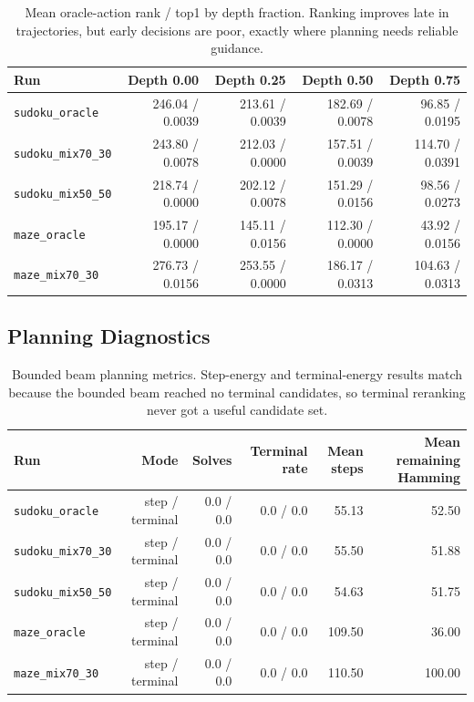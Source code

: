 \documentclass[11pt]{article}
\begin{document}
\begin{table}[H]
\centering
\scriptsize
\begin{tabular}{lrrrr}
\toprule
Run & Depth 0.00 & Depth 0.25 & Depth 0.50 & Depth 0.75 \\
\midrule
\texttt{sudoku\_oracle} & 246.04 / 0.0039 & 213.61 / 0.0039 & 182.69 / 0.0078 & 96.85 / 0.0195 \\
\texttt{sudoku\_mix70\_30} & 243.80 / 0.0078 & 212.03 / 0.0000 & 157.51 / 0.0039 & 114.70 / 0.0391 \\
\texttt{sudoku\_mix50\_50} & 218.74 / 0.0000 & 202.12 / 0.0078 & 151.29 / 0.0156 & 98.56 / 0.0273 \\
\texttt{maze\_oracle} & 195.17 / 0.0000 & 145.11 / 0.0156 & 112.30 / 0.0000 & 43.92 / 0.0156 \\
\texttt{maze\_mix70\_30} & 276.73 / 0.0156 & 253.55 / 0.0000 & 186.17 / 0.0313 & 104.63 / 0.0313 \\
\bottomrule
\end{tabular}
\caption{Mean oracle-action rank / top1 by depth fraction. Ranking improves late in trajectories, but early decisions are poor, exactly where planning needs reliable guidance.}
\end{table}

\subsection{Planning Diagnostics}

\begin{table}[H]
\centering
\small
\begin{tabular}{lrrrrr}
\toprule
Run & Mode & Solves & Terminal rate & Mean steps & Mean remaining Hamming \\
\midrule
\texttt{sudoku\_oracle} & step / terminal & 0.0 / 0.0 & 0.0 / 0.0 & 55.13 & 52.50 \\
\texttt{sudoku\_mix70\_30} & step / terminal & 0.0 / 0.0 & 0.0 / 0.0 & 55.50 & 51.88 \\
\texttt{sudoku\_mix50\_50} & step / terminal & 0.0 / 0.0 & 0.0 / 0.0 & 54.63 & 51.75 \\
\texttt{maze\_oracle} & step / terminal & 0.0 / 0.0 & 0.0 / 0.0 & 109.50 & 36.00 \\
\texttt{maze\_mix70\_30} & step / terminal & 0.0 / 0.0 & 0.0 / 0.0 & 110.50 & 100.00 \\
\bottomrule
\end{tabular}
\caption{Bounded beam planning metrics. Step-energy and terminal-energy results match because the bounded beam reached no terminal candidates, so terminal reranking never got a useful candidate set.}
\end{table}
\end{document}
